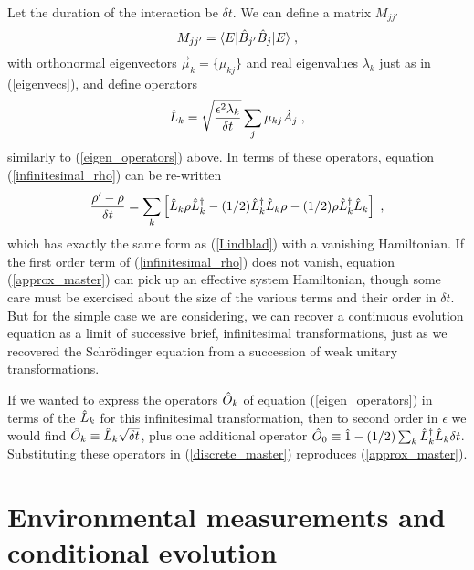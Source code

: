 Let the duration of the interaction be $\delta t$.
We can define a matrix $M_{jj'}$
\begin{equation}
M_{jj'} = {\langle E |}{\hat B}_{j'}{\hat B}_j{| E \rangle} \;,
\end{equation}
with orthonormal eigenvectors $\vec\mu_k = \{\mu_{kj}\}$ and real eigenvalues
$\lambda_k$ just as in (\ref{eigenvecs}), and define operators
\begin{equation}
{\hat L}_k = \sqrt{\epsilon^2\lambda_k\over\delta t} \sum_j \mu_{kj}{\hat A}_j \;,
\end{equation}
similarly to (\ref{eigen_operators}) above.
In terms of these operators, equation (\ref{infinitesimal_rho})
can be re-written
\begin{equation}
{{\rho'-\rho}\over \delta t} = \sum_k \left[
  {\hat L}_k \rho {\hat L^\dagger}_k - (1/2) {\hat L^\dagger}_k{\hat L}_k\rho - (1/2)\rho{\hat L^\dagger}_k{\hat L}_k
  \right] \;,
\label{approx_master}
\end{equation}
which has exactly the same form as (\ref{Lindblad}) with a vanishing
Hamiltonian.  If the first order term of (\ref{infinitesimal_rho})
does not vanish, equation (\ref{approx_master}) can pick up an effective
system Hamiltonian, though some care must be exercised about the size
of the various terms and their order in $\delta t$.  But for the simple
case we are considering, we can recover
a continuous evolution equation as a limit of successive brief,
infinitesimal transformations, just as we recovered the Schr\"odinger
equation from a succession of weak unitary transformations.

If we wanted to express the operators ${\hat O}_k$ of equation
(\ref{eigen_operators}) in terms of the ${\hat L}_k$ for
this infinitesimal transformation, then to second order in $\epsilon$
we would find ${\hat O}_k \equiv {\hat L}_k\sqrt{\delta t}$, plus one additional
operator ${\hat O}_0 \equiv {\hat 1} - (1/2)\sum_k {\hat L^\dagger}_k{\hat L}_k \delta t$.
Substituting these operators in (\ref{discrete_master}) reproduces
(\ref{approx_master}).


\section{Environmental measurements and \\ conditional evolution}

